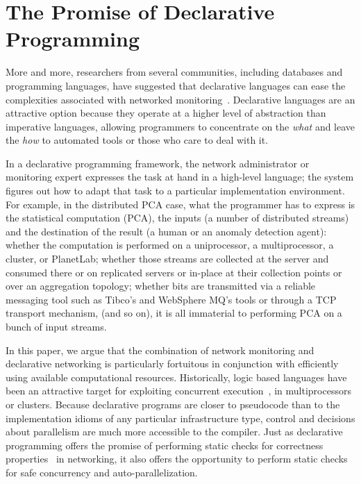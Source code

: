 \documentclass[10pt,twocolumn]{MyTightStyle}
\begin{document}
\section{The Promise of Declarative Programming} \label{rescue}

More and more, researchers from several communities, including databases
and programming languages, have suggested that declarative languages can
ease the complexities associated with networked
monitoring~\cite{hellerstein07,wawrzoniak03,roscoe02,loo05,loo06}.
Declarative languages are an attractive option because they operate at a
higher level of abstraction than imperative languages, allowing
programmers to concentrate on the {\em what} and leave the {\em how} to
automated tools or those who care to deal with it.

In a declarative programming framework, the network administrator or
monitoring expert expresses the task at hand in a high-level language;
the system figures out how to adapt that task to a particular
implementation environment. For example, in the distributed PCA
case, what the programmer has to express is the statistical computation (PCA),
the inputs (a number of distributed streams) and the destination of the
result (a human or an anomaly detection agent): whether the computation
is performed on a uniprocessor, a multiprocessor, a cluster, or PlanetLab;
whether those streams are collected at the server and consumed there or
on replicated servers or in-place at their collection points or over an
aggregation topology; whether bits are transmitted via a reliable
messaging tool such as Tibco's and WebSphere MQ's tools or through a TCP
transport mechanism, (and so on), it is all immaterial to 
performing PCA on a bunch of input streams.

In this paper, we argue that the combination of network monitoring and
declarative networking is particularly fortuitous in conjunction with
efficiently using available computational resources. Historically, logic
based languages have been an attractive target for exploiting concurrent
execution~\cite{gupta01}, in multiprocessors or clusters. Because
declarative programs are
closer to pseudocode than to the implementation idioms of any particular
infrastructure type, control and decisions about parallelism
are much more accessible to the compiler. Just as declarative
programming offers the promise of performing static checks for
correctness properties~\cite{feamster05} in networking, it also offers
the opportunity to perform static checks for safe concurrency
and auto-parallelization.
\end{document}
